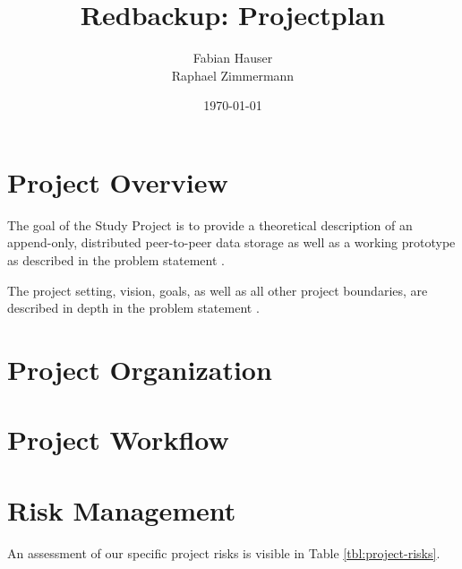 \documentclass[a4paper]{article}
\title{Redbackup: Projectplan}
\author{
		Fabian Hauser \\
		Raphael Zimmermann
}
\date{\today}
\begin{document}
\maketitle

\section{Project Overview}
The goal of the Study Project is to provide a theoretical description of an append-only, distributed peer-to-peer data storage as well as a working prototype as described in the problem statement \cite{problemstatement}.

The project setting, vision, goals, as well as all other project boundaries, are described in depth in the problem statement \cite{problemstatement}.

\section{Project Organization}


\section{Project Workflow}


\section{Risk Management}
An assessment of our specific project risks is visible in Table \ref{tbl:project-risks}.
\end{document}
